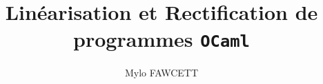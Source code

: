 \documentclass[french, 12pt]{article}
\title{Linéarisation et Rectification de programmes \texttt{OCaml}}
\author{Mylo FAWCETT}
\date{}
\theoremstyle{definition}
\theoremstyle{plain}
\theoremstyle{remark}
\begin{document}
\maketitle
\tableofcontents
\pagebreak




\end{document}
